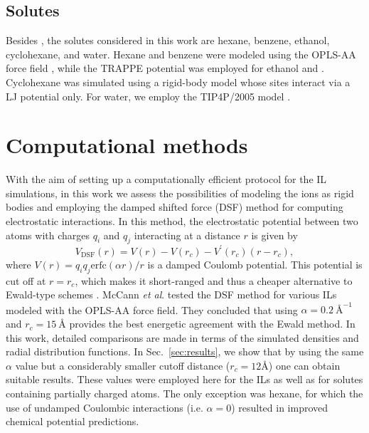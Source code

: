 \documentclass[3p,twocolumn]{elsarticle}
\begin{document}
\subsection{Solutes}
\label{sec:force_field_sol}

Besides , the solutes considered in this work are hexane, benzene, ethanol, cyclohexane, and water.
Hexane and benzene were modeled using the OPLS-AA force field \cite{Jorgensen_1996}, while the TRAPPE potential \cite{Chen_2001,Potoff_2001} was employed for ethanol and .
Cyclohexane was simulated using a rigid-body model \cite{munoz2015lennard} whose sites interact via a LJ potential only.
For water, we employ the TIP4P/2005 model \cite{Abascal_2005,Vega_2011}.

\section{Computational methods}
\label{sec:sim_details}

With the aim of setting up a computationally efficient protocol for the IL simulations, in this work we assess the possibilities of modeling the ions as rigid bodies and employing the damped shifted force (DSF) method \cite{Fennell2006} for computing electrostatic interactions.
In this method, the electrostatic potential between two atoms with charges $q_i$ and $q_j$ interacting at a distance $r$ is given by
\begin{equation}
V_\text{DSF}(r) = V(r) - V(r_c) - V^\prime(r_c)(r-r_c),
\end{equation}
where $V(r) = q_i q_j {\text{erfc}(\alpha r)}/{r}$ is a damped Coulomb potential.
This potential is cut off at $r = r_c$, which makes it short-ranged and thus a cheaper alternative to Ewald-type schemes \cite{Ewald_1921,Darden_1993,Hockney_1988}.
McCann \textit{et al}. \cite{McCann_2013} tested the DSF method for various ILs modeled with the OPLS-AA force field.
They concluded that using $\alpha = 0.2~\text{\AA}^{-1}$ and $r_c = 15~\text{\AA}$ provides the best energetic agreement with the Ewald method.
In this work, detailed comparisons are made in terms of the simulated densities and radial distribution functions.
In Sec.~\ref{sec:results}, we show that by using the same $\alpha$ value but a considerably smaller cutoff distance ($r_c = 12 \text{\AA}$) one can obtain suitable results.
These values were employed here for the ILs as well as for solutes containing partially charged atoms.
The only exception was hexane, for which the use of undamped Coulombic interactions (i.e. $\alpha = 0$) resulted in improved chemical potential predictions.
\end{document}
